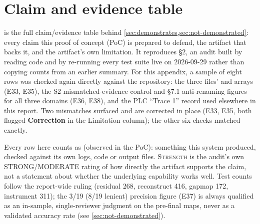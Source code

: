 \section{Claim and evidence table}
\label{app:claims}

 is the full claim/evidence table behind
\cref{sec:demonstrates,sec:not-demonstrated}: every claim this proof of concept (PoC) is prepared
to defend, the artifact that backs it, and the artifact's own limitation. It reproduces
 \S2, an audit built by reading code and by re-running
every test suite live on 2026-09-29 rather than copying counts from an earlier summary. For this
appendix, a sample of eight rows was checked again directly against the repository: the three
 files'  and  arrays (E33, E35), the S2
mismatched-evidence control and \S7.1 anti-renaming figures for all three domains (E36, E38), and
the PLC \enquote{Trace 1} record used elsewhere in this report. Two mismatches surfaced and are
corrected in place (E33, E35, both flagged \textbf{Correction} in the Limitation column); the
other six checks matched exactly.

Every row here counts as \evobs{} (observed in the PoC): something this system produced, checked
against its own logs, code or output files. \textsc{Strength} is the audit's own STRONG/MODERATE
rating of how directly the artifact supports the claim, not a statement about whether the
underlying capability works well. Test counts follow the report-wide ruling (residual 268,
reconstruct 416, gapmap 172, instrument 311); the 3/19 (8/19 lenient) precision figure (E37) is
always qualified as an in-sample, single-reviewer judgment on the pre-final maps, never as a
validated accuracy rate (see \cref{sec:not-demonstrated}).


